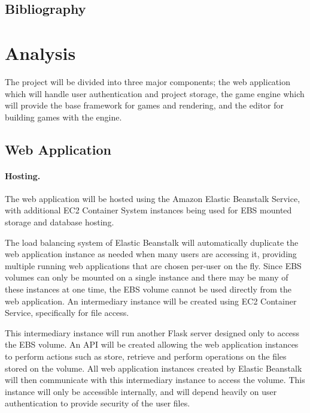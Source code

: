 \documentclass[a4paper, 12pt]{article}
\begin{document}
\subsection{Bibliography}

\begingroup
	\def\section*#1{}
	{}
	
\endgroup

\section{Analysis}

The project will be divided into three major components; the web application which will handle user authentication and project storage, the game engine which will provide the base framework for games and rendering, and the editor for building games with the engine.

\subsection{Web Application}
\paragraph{Hosting.}
The web application will be hosted using the Amazon Elastic Beanstalk Service, with additional EC2 Container System instances being used for EBS mounted storage and database hosting.

The load balancing system of Elastic Beanstalk will automatically duplicate the web application instance as needed when many users are accessing it, providing multiple running web applications that are chosen per-user on the fly. Since EBS volumes can only be mounted on a single instance and there may be many of these instances at one time, the EBS volume cannot be used directly from the web application. An intermediary instance will be created using EC2 Container Service, specifically for file access. 

This intermediary instance will run another Flask server designed only to access the EBS volume. An API will be created allowing the web application instances to perform actions such as store, retrieve and perform operations on the files stored on the volume. All web application instances created by Elastic Beanstalk will then communicate with this intermediary instance to access the volume. This instance will only be accessible internally, and will depend heavily on user authentication to provide security of the user files.
\end{document}
